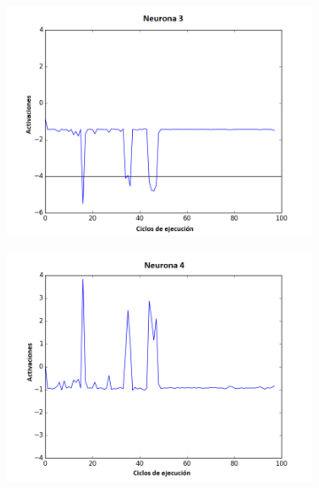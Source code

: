 \begin{figure}[!h]
\begin{subfigure}{0.33\textwidth}
  \includegraphics[width=\linewidth]{Imagenes/Agente1Activaciones/Agente4/Neurona2}
\end{subfigure}
\medskip
\begin{subfigure}{0.33\textwidth}
  \includegraphics[width=\linewidth]{Imagenes/Agente1Activaciones/Agente4/Neurona3}
\end{subfigure}\hfil %
\begin{subfigure}{0.33\textwidth}

\end{subfigure}
\end{figure}
